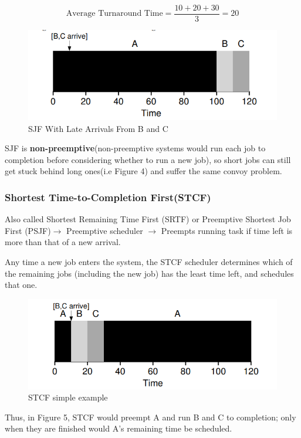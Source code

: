 \documentclass{article}
\begin{document}
$$\text{Average Turnaround Time} = \frac{10 + 20 + 30}{3} = 20$$
\begin{figure}[H]
        \centering
        \includegraphics[width=0.6\linewidth]{image/sjf2.png}
        \caption{SJF With Late Arrivals From B and C}
\end{figure}
SJF is \textbf{non-preemptive}(non-preemptive systems would run each job to completion before considering whether to run a new job), so short jobs can still get stuck behind long ones(i.e Figure 4) and suffer the same convoy problem.

\subsubsection{Shortest Time-to-Completion First(STCF)}
Also called Shortest Remaining Time First (SRTF) or Preemptive Shortest Job First (PSJF)$\rightarrow$ Preemptive scheduler $\rightarrow$ Preempts running task if time left is more than that of a new arrival.

Any time a new job enters the system, the STCF scheduler determines which of the remaining jobs (including the new job) has the least time left, and schedules that one. 
\begin{figure}[H]
        \centering
        \includegraphics[width=0.6\linewidth]{image/stcf.png}
        \caption{STCF simple example}
\end{figure}
Thus, in Figure 5, STCF would preempt A and run B and C to completion; only when they are finished would A's remaining time be scheduled.
\end{document}
